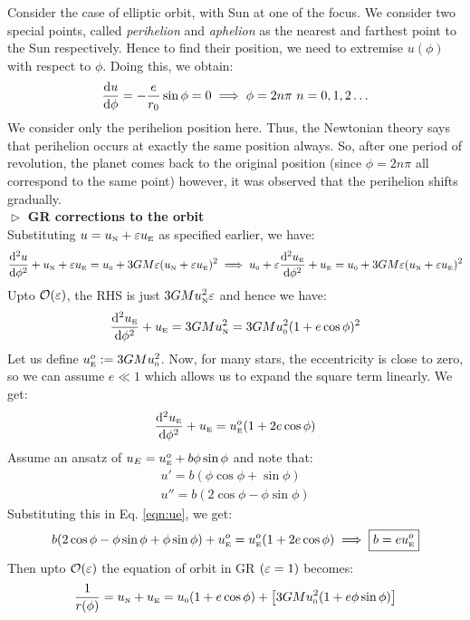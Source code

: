 \noindent
Consider the case of elliptic orbit, with Sun at one of the focus. We consider two special points, called \textit{perihelion} and \textit{aphelion} as the nearest and farthest point to the Sun respectively. Hence to find their position, we need to extremise $u(\phi)$ with respect to $\phi$. Doing this, we obtain:
$$\dv{u}{\phi} = -\frac{e}{r_0}\sin\phi = 0\implies \phi = 2n\pi\ n = 0,1,2\ldots$$
We consider only the perihelion position here. Thus, the Newtonian theory says that perihelion occurs at exactly the same position always. So, after one period of revolution, the planet comes back to the original position (since $\phi = 2n\pi$ all correspond to the same point) however, it was observed that the perihelion shifts gradually. \\[0.2cm]
$\vartriangleright$ \textbf{GR corrections to the orbit}\\[0.2cm]
Substituting $u=u_{\text{\tiny N}} + \varepsilon u_{\text{\tiny E}}$ as specified earlier, we have:
\begin{align*}
    \dv[2]{u}{\phi} + u_{\text{\tiny N}} + \varepsilon u_{\text{\tiny E}} =u_{\text{\tiny 0}}+ 3GM\varepsilon (u_{\text{\tiny N}} + \varepsilon u_{\text{\tiny E}})^2   \implies u_{\text{\tiny 0}} + \varepsilon \dv[2]{u_{\text{\tiny E}}}{\phi} + u_{\text{\tiny E}} = u_{\text{\tiny 0}} +3GM\varepsilon (u_{\text{\tiny N}} + \varepsilon u_{\text{\tiny E}})^2 
\end{align*}
Upto $\mathcal O(\varepsilon)$, the RHS is just $3GMu_{\text{\tiny N}}^2 \varepsilon$ and hence we have:
$$ \dv[2]{u_{\text{\tiny E}}}{\phi} + u_{\text{\tiny E}} = 3GMu_{\text{\tiny N}}^2 = 3GMu_{\text{\tiny 0}}^2 (1+e\cos\phi)^2$$
Let us define $u_{\text{\tiny E}}^o :=3GMu_{\text{\tiny 0}}^2$. Now, for many stars, the eccentricity is close to zero, so we can assume $e\ll 1$ which allows us to expand the square term linearly. We get:
\begin{equation}\label{eqn:ue}
    \dv[2]{u_{\text{\tiny E}}}{\phi} + u_{\text{\tiny E}} = u_{\text{\tiny E}}^o(1+2e\cos\phi)
\end{equation}
Assume an ansatz of $u_E =  u_{\text{\tiny E}}^o + b\phi \sin\phi$ and note that:
\begin{align*}
    u' = b(\phi \cos\phi + \sin\phi) \\
    u'' = b(2\cos\phi -\phi \sin\phi )
\end{align*}
Substituting this in Eq. \ref{eqn:ue}, we get:
\begin{align*}
    b (2\cos\phi-\phi\sin\phi+\phi\sin\phi)+ u_{\text{\tiny E}}^o=  u_{\text{\tiny E}}^o(1+2e\cos\phi) \implies \boxed{b=e u_{\text{\tiny E}}^o}
\end{align*}
Then upto $\mathcal O(\varepsilon)$ the equation of orbit in GR $(\varepsilon=1)$ becomes:
\begin{equation}\label{eqn:grrad}
    \frac{1}{r(\phi)} =  u_{\text{\tiny N}}+  u_{\text{\tiny E}} = u_{\text{\tiny 0}}(1+e\cos\phi) + \qty[3GMu_{\text{\tiny 0}}^2(1+e\phi\sin\phi)]
\end{equation}
